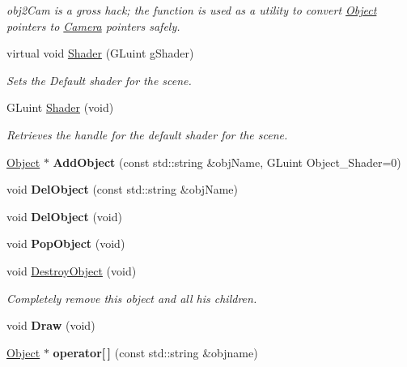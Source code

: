 \begin{DoxyCompactItemize}
\begin{DoxyCompactList}\small\item\em obj2\-Cam is a gross hack; the function is used as a utility to convert \hyperlink{class_object}{Object} pointers to \hyperlink{class_camera}{Camera} pointers safely. \end{DoxyCompactList}\item 
virtual void \hyperlink{class_scene_a7137a7302c21ac4dd44e746bfb6f7cf8}{Shader} (G\-Luint g\-Shader)
\begin{DoxyCompactList}\small\item\em Sets the Default shader for the scene. \end{DoxyCompactList}\item 
G\-Luint \hyperlink{class_scene_af1e8ba8802f3bf83cebbfcbf3ed7c333}{Shader} (void)
\begin{DoxyCompactList}\small\item\em Retrieves the handle for the default shader for the scene. \end{DoxyCompactList}\item 
\hypertarget{class_scene_a366b5dec1ecf66a887b4d0dedcd1aa3b}{\hyperlink{class_object}{Object} $\ast$ {\bfseries Add\-Object} (const std\-::string \&obj\-Name, G\-Luint Object\-\_\-\-Shader=0)}\label{class_scene_a366b5dec1ecf66a887b4d0dedcd1aa3b}

\item 
\hypertarget{class_scene_a3bd9fa1058f506c04162b9283e97d20e}{void {\bfseries Del\-Object} (const std\-::string \&obj\-Name)}\label{class_scene_a3bd9fa1058f506c04162b9283e97d20e}

\item 
\hypertarget{class_scene_a43fd3c56db5dc940d1724b9573c9a360}{void {\bfseries Del\-Object} (void)}\label{class_scene_a43fd3c56db5dc940d1724b9573c9a360}

\item 
\hypertarget{class_scene_abdfd15e7987aa261840d5ecc265170df}{void {\bfseries Pop\-Object} (void)}\label{class_scene_abdfd15e7987aa261840d5ecc265170df}

\item 
\hypertarget{class_scene_a82759ded1f6f87a91b8d10ed87501958}{void \hyperlink{class_scene_a82759ded1f6f87a91b8d10ed87501958}{Destroy\-Object} (void)}\label{class_scene_a82759ded1f6f87a91b8d10ed87501958}

\begin{DoxyCompactList}\small\item\em Completely remove this object and all his children. \end{DoxyCompactList}\item 
\hypertarget{class_scene_ad5a91c929b569b9111061eec16b3febf}{void {\bfseries Draw} (void)}\label{class_scene_ad5a91c929b569b9111061eec16b3febf}

\item 
\hypertarget{class_scene_ae9b69d8db8a46991017635f22e45baad}{\hyperlink{class_object}{Object} $\ast$ {\bfseries operator\mbox{[}$\,$\mbox{]}} (const std\-::string \&objname)}\label{class_scene_ae9b69d8db8a46991017635f22e45baad}

\end{DoxyCompactItemize}
